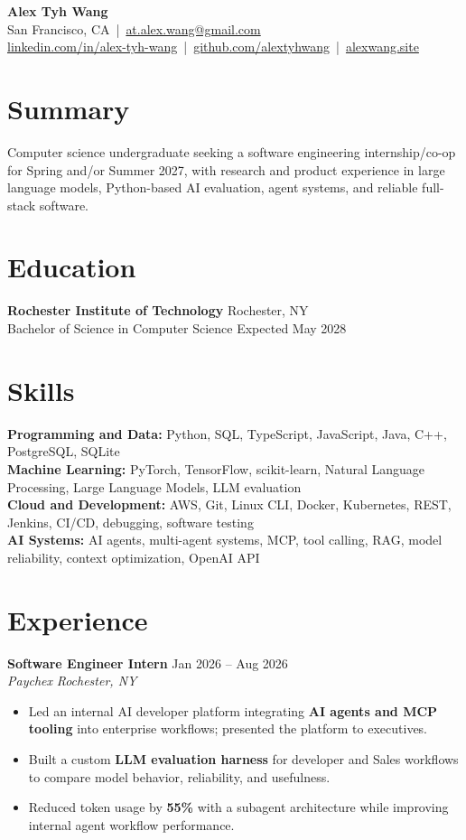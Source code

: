 \documentclass[10pt,letterpaper]{article}
\newif\ifresumeFirstRole
\newcommand{\resumeRole}[4]{%
  \ifresumeFirstRole
    \global\resumeFirstRolefalse
  \else
    \vspace{0pt plus 1fill}%
  \fi
  \textbf{#1} \hfill #2\\
  \textit{#3} \hfill \textit{#4}
}
\begin{document}
\begin{center}
{\Large \textbf{Alex Tyh Wang}}\\
San Francisco, CA \,|\, \href{mailto:at.alex.wang@gmail.com}{at.alex.wang@gmail.com}\\
\small \href{https://www.linkedin.com/in/alex-tyh-wang/}{linkedin.com/in/alex-tyh-wang} \,|\, \href{https://github.com/alextyhwang}{github.com/alextyhwang} \,|\, \href{https://alexwang.site}{alexwang.site}
\end{center}

\section*{Summary}
Computer science undergraduate seeking a software engineering internship/co-op for Spring and/or Summer 2027, with research and product experience in large language models, Python-based AI evaluation, agent systems, and reliable full-stack software.

\section*{Education}
\textbf{Rochester Institute of Technology} \hfill Rochester, NY\\
Bachelor of Science in Computer Science \hfill Expected May 2028

\section*{Skills}
\textbf{Programming and Data:} Python, SQL, TypeScript, JavaScript, Java, C++, PostgreSQL, SQLite\\
\textbf{Machine Learning:} PyTorch, TensorFlow, scikit-learn, Natural Language Processing, Large Language Models, LLM evaluation\\
\textbf{Cloud and Development:} AWS, Git, Linux CLI, Docker, Kubernetes, REST, Jenkins, CI/CD, debugging, software testing\\
\textbf{AI Systems:} AI agents, multi-agent systems, MCP, tool calling, RAG, model reliability, context optimization, OpenAI API

\section*{Experience}
\resumeRole{Software Engineer Intern}{Jan 2026 -- Aug 2026}{Paychex}{Rochester, NY}
\begin{itemize}
  \item Led an internal AI developer platform integrating \textbf{AI agents and MCP tooling} into enterprise workflows; presented the platform to executives.
  \item Built a custom \textbf{LLM evaluation harness} for developer and Sales workflows to compare model behavior, reliability, and usefulness.
  \item Reduced token usage by \textbf{55\%} with a subagent architecture while improving internal agent workflow performance.
\end{itemize}
\end{document}
